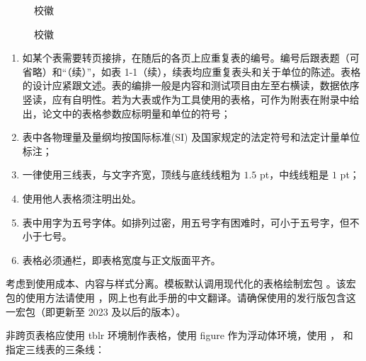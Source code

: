 \begin{texcodeonly}[]{}
  \begin{figure}[h]
    \subfigg    \subfigg
    \subfigg    \subfigg
    \subfigg    \subfigg
    \caption{校徽}
  \end{figure}
\end{texcodeonly}

\begin{figure}[h]
  \subfigg    \subfigg
  \subfigg    \subfigg
  \subfigg    \subfigg
  \caption{校徽}
\end{figure}


\clearpage


\begin{tcolorbox}[colback=red!5!white,colframe=red!75!black]
  \begin{enumerate}[leftmargin=0.5cm]
    \item 如某个表需要转页接排，在随后的各页上应重复表的编号。编号后跟表题（可省略）和“（续）”，如表 1-1（续），续表均应重复表头和关于单位的陈述。表格的设计应紧跟文述。表的编排一般是内容和测试项目由左至右横读，数据依序竖读，应有自明性。若为大表或作为工具使用的表格，可作为附表在附录中给出，论文中的表格参数应标明量和单位的符号；
    \item 表中各物理量及量纲均按国际标准(SI) 及国家规定的法定符号和法定计量单位标注；
    \item 一律使用三线表，与文字齐宽，顶线与底线线粗为 $1.5$ pt，中线线粗是 $1$ pt；
    \item 使用他人表格须注明出处。
    \item 表中用字为五号字体。如排列过密，用五号字有困难时，可小于五号字，但不小于七号。
    \item 表格必须通栏，即表格宽度与正文版面平齐。
  \end{enumerate}
\end{tcolorbox}




考虑到使用成本、内容与样式分离。模板默认调用现代化的表格绘制宏包 。该宏包的使用方法请使用 ，网上也有此手册的中文翻译。请确保使用的发行版包含这一宏包（即更新至 2023 及以后的版本）。

非跨页表格应使用 tblr 环境制作表格，使用 figure 作为浮动体环境，使用 \clist{\toprule}，\clist{\midrule} 和 \clist{\bottomrule} 指定三线表的三条线：

